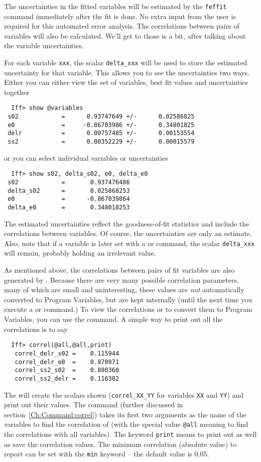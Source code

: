 {}

The uncertainties in the fitted variables will be estimated by the
{\texttt{feffit}} command immediately after the fit is done.  No extra
input from the user is required for this automated error analysis.  The
correlations between pairs of variables will also be calculated.  We'll get
to those is a bit, after talking about the variable uncertainties.

For each variable {\tt{xxx}}, the scalar {\tt{delta\_xxx}} will be used to
store the estimated uncertainty for that variable.  This allows you to see
the uncertainties two ways. Either you can either view the set of
variables, best fit values and  uncertainties together
\begin{verbatim}
  Iff> show @variables
 s02            =      0.93747649 +/-      0.02586825
 e0             =     -0.86703986 +/-      0.34801825
 delr           =      0.00757485 +/-      0.00153554
 ss2            =      0.00352229 +/-      0.00015579
\end{verbatim}
\noindent
or you can select individual variables or uncertainties
\begin{verbatim}
  Iff> show s02, delta_s02, e0, delta_e0
 s02            =       0.937476486
 delta_s02      =       0.025868253
 e0             =      -0.867039864
 delta_e0       =       0.348018253
\end{verbatim}
\noindent
The estimated uncertainties reflect the goodness-of-fit statistics and
include the correlations between variables.  Of course, the uncertainties
are only an estimate.  Also, note that if a variable is later set with a
{} or {} command, the scalar {\tt{delta\_xxx}} will
remain, probably holding an irrelevant value.

{}
As mentioned above, the correlations between pairs of fit variables are
also generated by {}.  Because there are very many possible
correlation parameters, many of which are small and uninteresting, these
values are {\emph{not}} automatically converted to Program Variables, but
are kept internally (until the next time you execute a {} or
{} command.)  To view the correlations or to convert them to
Program Variables, you can use the {} command.  A simple way
to print out all the correlations is to say
\begin{verbatim}
  Iff> correl(@all,@all,print)
   correl_delr_s02 =    0.115944
   correl_delr_e0  =    0.870971
   correl_ss2_s02  =    0.880360
   correl_ss2_delr =    0.116302
\end{verbatim}
\noindent
The will create the scalars shown ({\tt{correl\_XX\_YY}} for variables
{\tt{XX}} and {\tt{YY}}) and print out their values.  The {}
command (further discussed in section~\ref{Ch:Command:correl}) takes its
first two arguments as the name of the variables to find the correlation of
(with the special value {\tt{@all}} meaning to find the correlations with
all variables).  The keyword {\tt{print}} means to print out as well as save
the correlation values.  The minimum correlation (absolute value) to report
can be set with the {\tt{min}} keyword -- the default value is 0.05.
